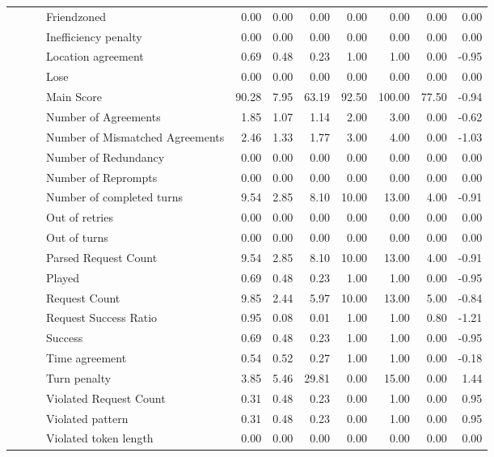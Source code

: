 \begin{tabular}{llllrrrrrrr}
 &  &  & Friendzoned & 0.00 & 0.00 & 0.00 & 0.00 & 0.00 & 0.00 & 0.00 \\
 &  &  & Inefficiency penalty & 0.00 & 0.00 & 0.00 & 0.00 & 0.00 & 0.00 & 0.00 \\
 &  &  & Location agreement & 0.69 & 0.48 & 0.23 & 1.00 & 1.00 & 0.00 & -0.95 \\
 &  &  & Lose & 0.00 & 0.00 & 0.00 & 0.00 & 0.00 & 0.00 & 0.00 \\
 &  &  & Main Score & 90.28 & 7.95 & 63.19 & 92.50 & 100.00 & 77.50 & -0.94 \\
 &  &  & Number of Agreements & 1.85 & 1.07 & 1.14 & 2.00 & 3.00 & 0.00 & -0.62 \\
 &  &  & Number of Mismatched Agreements & 2.46 & 1.33 & 1.77 & 3.00 & 4.00 & 0.00 & -1.03 \\
 &  &  & Number of Redundancy & 0.00 & 0.00 & 0.00 & 0.00 & 0.00 & 0.00 & 0.00 \\
 &  &  & Number of Reprompts & 0.00 & 0.00 & 0.00 & 0.00 & 0.00 & 0.00 & 0.00 \\
 &  &  & Number of completed turns & 9.54 & 2.85 & 8.10 & 10.00 & 13.00 & 4.00 & -0.91 \\
 &  &  & Out of retries & 0.00 & 0.00 & 0.00 & 0.00 & 0.00 & 0.00 & 0.00 \\
 &  &  & Out of turns & 0.00 & 0.00 & 0.00 & 0.00 & 0.00 & 0.00 & 0.00 \\
 &  &  & Parsed Request Count & 9.54 & 2.85 & 8.10 & 10.00 & 13.00 & 4.00 & -0.91 \\
 &  &  & Played & 0.69 & 0.48 & 0.23 & 1.00 & 1.00 & 0.00 & -0.95 \\
 &  &  & Request Count & 9.85 & 2.44 & 5.97 & 10.00 & 13.00 & 5.00 & -0.84 \\
 &  &  & Request Success Ratio & 0.95 & 0.08 & 0.01 & 1.00 & 1.00 & 0.80 & -1.21 \\
 &  &  & Success & 0.69 & 0.48 & 0.23 & 1.00 & 1.00 & 0.00 & -0.95 \\
 &  &  & Time agreement & 0.54 & 0.52 & 0.27 & 1.00 & 1.00 & 0.00 & -0.18 \\
 &  &  & Turn penalty & 3.85 & 5.46 & 29.81 & 0.00 & 15.00 & 0.00 & 1.44 \\
 &  &  & Violated Request Count & 0.31 & 0.48 & 0.23 & 0.00 & 1.00 & 0.00 & 0.95 \\
 &  &  & Violated pattern & 0.31 & 0.48 & 0.23 & 0.00 & 1.00 & 0.00 & 0.95 \\
 &  &  & Violated token length & 0.00 & 0.00 & 0.00 & 0.00 & 0.00 & 0.00 & 0.00 \\

\end{tabular}
